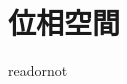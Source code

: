 \documentclass{jsarticle}
\begin{document}
\fi

\section{位相空間}

\expandafter\ifx\csname readornot\endcsname\relax
  
\end{document}
